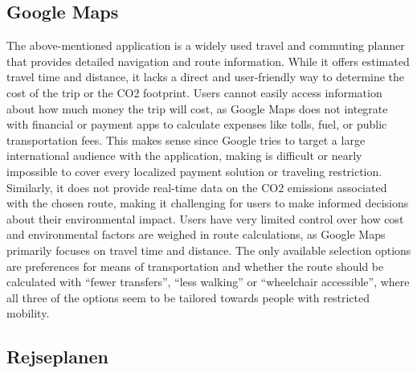 \subsection{Google Maps}\label{subsec:google-maps}

The above-mentioned application is a widely used travel and commuting planner that provides detailed navigation and
route information.
While it offers estimated travel time and distance, it lacks a direct and user-friendly way to determine the cost of the
trip or the CO2 footprint.
Users cannot easily access information about how much money the trip will cost, as Google Maps does not integrate with
financial or payment apps to calculate expenses like tolls, fuel, or public transportation fees.
This makes sense since Google tries to target a large international audience with the application, making is difficult
or nearly impossible to cover every localized payment solution or traveling restriction.
Similarly, it does not provide real-time data on the CO2 emissions associated with the chosen route, making it
challenging for users to make informed decisions about their environmental impact.
Users have very limited control over how cost and environmental factors are weighed in route calculations, as Google
Maps primarily focuses on travel time and distance.
The only available selection options are preferences for means of transportation and whether the route should be
calculated with ``fewer transfers'', ``less walking'' or ``wheelchair accessible'', where all three of the options
seem to be tailored towards people with restricted mobility.

\subsection{Rejseplanen}\label{subsec:rejseplanen}

